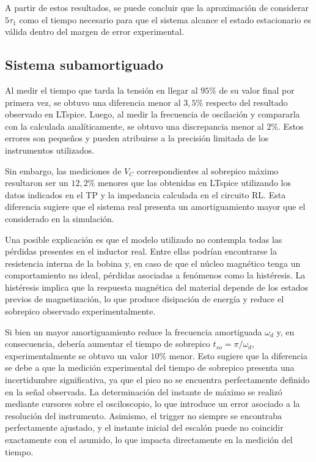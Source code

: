 A partir de estos resultados, se puede concluir que la aproximación de considerar $5\tau_1$ como el tiempo necesario para que el sistema alcance el estado estacionario es válida dentro del margen de error experimental.

\subsection{Sistema subamortiguado}
Al medir el tiempo que tarda la tensión en llegar al $95\%$ de su valor final por primera vez, se obtuvo una diferencia menor al $3,5\%$ respecto del resultado observado en LTspice. Luego, al medir la frecuencia de oscilación y compararla con la calculada analíticamente, se obtuvo una discrepancia menor al $2\%$. Estos errores son pequeños y pueden atribuirse a la precisión limitada de los instrumentos utilizados.

Sin embargo, las mediciones de $V_C$ correspondientes al sobrepico máximo resultaron ser un $12,2\%$ menores que las obtenidas en LTspice utilizando los datos indicados en el TP y la impedancia calculada en el circuito RL. Esta diferencia sugiere que el sistema real presenta un amortiguamiento mayor que el considerado en la simulación.

Una posible explicación es que el modelo utilizado no contempla todas las pérdidas presentes en el inductor real. Entre ellas podrían encontrarse la resistencia interna de la bobina y, en caso de que el núcleo magnético tenga un comportamiento no ideal, pérdidas asociadas a fenómenos como la histéresis. La histéresis implica que la respuesta magnética del material depende de los estados previos de magnetización, lo que produce disipación de energía y reduce el sobrepico observado experimentalmente.

Si bien un mayor amortiguamiento reduce la frecuencia amortiguada $\omega_d$ y, en consecuencia, debería aumentar el tiempo de sobrepico $t_{so} = \pi/\omega_d$, experimentalmente se obtuvo un valor $10\%$ menor. Esto sugiere que la diferencia se debe a que la medición experimental del tiempo de sobrepico presenta una incertidumbre significativa, ya que el pico no se encuentra perfectamente definido en la señal observada. La determinación del instante de máximo se realizó mediante cursores sobre el osciloscopio, lo que introduce un error asociado a la resolución del instrumento. Asimismo, el trigger no siempre se encontraba perfectamente ajustado, y el instante inicial del escalón puede no coincidir exactamente con el asumido, lo que impacta directamente en la medición del tiempo.


